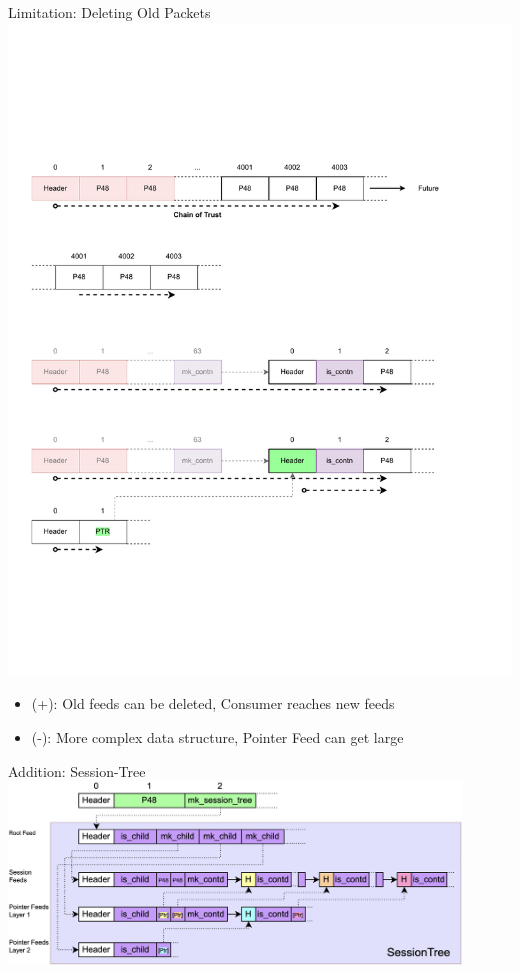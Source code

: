 \documentclass[aspectratio=169]{beamer}
\begin{document}
\begin{frame}[c]{Limitation: Deleting Old Packets}
\includegraphics[width=1\textwidth]{images/session_4.pdf}
\begin{itemize}
	\item (+): Old feeds can be deleted, Consumer reaches new feeds
	\item (-): More complex data structure, Pointer Feed can get large
\end{itemize}
\end{frame}

\begin{frame}[c]{Addition: Session-Tree}
\includegraphics[width=0.9\textwidth]{images/session_5.png}      
\end{frame}
\end{document}
